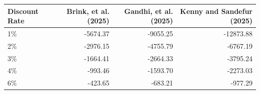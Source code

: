 \begin{tabular}{lrrr}
\toprule
Discount Rate & Brink, et al. (2025) & Gandhi, et al. (2025) & Kenny and Sandefur (2025) \\
\midrule
1\% & -5674.37 & -9055.25 & -12873.88 \\
2\% & -2976.15 & -4755.79 & -6767.19 \\
3\% & -1664.41 & -2664.33 & -3795.24 \\
4\% & -993.46 & -1593.70 & -2273.03 \\
6\% & -423.65 & -683.21 & -977.29 \\
\bottomrule
\end{tabular}
